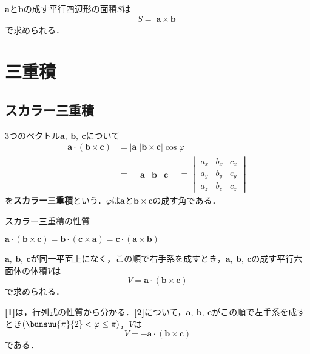 $\bm{a}$と$\bm{b}$の成す平行四辺形の面積$S$は
\begin{equation}
	S = |\bm{a} \times \bm{b}|
\end{equation}
で求められる．



\section{三重積}
\subsection{スカラー三重積}

3つのベクトル$\bm{a},\ \bm{b},\ \bm{c}$について
\begin{align}
	\bm{a} \cdot (\bm{b} \times \bm{c}) &= |\bm{a}||\bm{b} \times \bm{c}|\cos\varphi \\
	&=
	\begin{vmatrix}
		\bm{a} & \bm{b} & \bm{c}
	\end{vmatrix}
	=
	\begin{vmatrix}
		a_x & b_x & c_x\\
		a_y & b_y & c_y\\
		a_z & b_z & c_z
	\end{vmatrix}
\end{align}
を\textbf{スカラー三重積}という．$\varphi$は$\bm{a}$と$\bm{b} \times \bm{c}$の成す角である．

\begin{kousiki}{スカラー三重積の性質}
	\begin{enumerate}[label=\textbf{[\arabic*]}, labelsep=10pt, leftmargin=23pt]
		\item $\bm{a} \cdot (\bm{b} \times \bm{c}) = \bm{b} \cdot (\bm{c} \times \bm{a}) = \bm{c} \cdot (\bm{a} \times \bm{b})$
		\item $\bm{a},\ \bm{b},\ \bm{c}$が同一平面上になく，この順で右手系を成すとき，$\bm{a},\ \bm{b},\ \bm{c}$の成す平行六面体の体積$V$は
		\begin{equation}
			V = \bm{a} \cdot (\bm{b} \times \bm{c})
		\end{equation}
		で求められる．
	\end{enumerate}
\end{kousiki}

\textbf{[1]}は，行列式の性質から分かる．\textbf{[2]}について，$\bm{a},\ \bm{b},\ \bm{c}$がこの順で左手系を成すとき$\left(\bunsuu{\pi}{2} < \varphi \le \pi\right)$，$V$は
\begin{equation}
	V = -\bm{a} \cdot (\bm{b} \times \bm{c})
\end{equation}
である．



